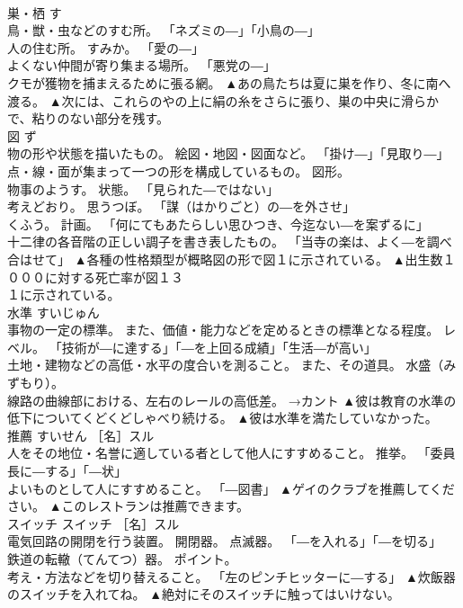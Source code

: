 \documentclass[8pt]{extreport}
\begin{document}
\begin{CJK}{UTF8}{min}
\\	巣・栖	す	
\\	鳥・獣・虫などのすむ所。 「ネズミの―」「小鳥の―」 
\\	人の住む所。 すみか。 「愛の―」 
\\	よくない仲間が寄り集まる場所。 「悪党の―」 
\\	クモが獲物を捕まえるために張る網。	▲あの鳥たちは夏に巣を作り、冬に南へ渡る。 ▲次には、これらのやの上に絹の糸をさらに張り、巣の中央に滑らかで、粘りのない部分を残す。
\\	図	ず	
\\	物の形や状態を描いたもの。 絵図・地図・図面など。 「掛け―」「見取り―」 
\\	点・線・面が集まって一つの形を構成しているもの。 図形。 
\\	物事のようす。 状態。 「見られた―ではない」 
\\	考えどおり。 思うつぼ。 「謀（はかりごと）の―を外させ」 
\\	くふう。 計画。 「何にてもあたらしい思ひつき、今迄ない―を案ずるに」 
\\	十二律の各音階の正しい調子を書き表したもの。 「当寺の楽は、よく―を調べ合はせて」	▲各種の性格類型が概略図の形で図１に示されている。 ▲出生数１０００に対する死亡率が図１３
\\	１に示されている。
\\	水準	すいじゅん	
\\	事物の一定の標準。 また、価値・能力などを定めるときの標準となる程度。 レベル。 「技術が―に達する」「―を上回る成績」「生活―が高い」 
\\	土地・建物などの高低・水平の度合いを測ること。 また、その道具。 水盛（みずもり）。 
\\	線路の曲線部における、左右のレールの高低差。 →カント	▲彼は教育の水準の低下についてくどくどしゃべり続ける。 ▲彼は水準を満たしていなかった。
\\	推薦	すいせん	［名］スル 
\\	人をその地位・名誉に適している者として他人にすすめること。 推挙。 「委員長に―する」「―状」 
\\	よいものとして人にすすめること。 「―図書」	▲ゲイのクラブを推薦してください。 ▲このレストランは推薦できます。
\\	スイッチ	スイッチ	［名］スル 
\\	電気回路の開閉を行う装置。 開閉器。 点滅器。 「―を入れる」「―を切る」 
\\	鉄道の転轍（てんてつ）器。 ポイント。 
\\	考え・方法などを切り替えること。 「左のピンチヒッターに―する」	▲炊飯器のスイッチを入れてね。 ▲絶対にそのスイッチに触ってはいけない。

\end{CJK}
\end{document}
